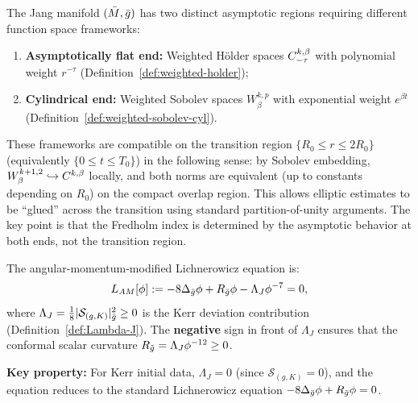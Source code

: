 \begin{remark}\label{rem:space-compatibility}
The Jang manifold $(\bar{M}, \bar{g})$ has two distinct asymptotic regions requiring different function space frameworks:
\begin{enumerate}[label=(\roman*)]
    \item \textbf{Asymptotically flat end:} Weighted H\"older spaces $C^{k,\beta}_{-\tau}$ with polynomial weight $r^{-\tau}$ (Definition~\ref{def:weighted-holder});
    \item \textbf{Cylindrical end:} Weighted Sobolev spaces $W^{k,p}_\beta$ with exponential weight $e^{\beta t}$ (Definition~\ref{def:weighted-sobolev-cyl}).
\end{enumerate}
These frameworks are compatible on the transition region $\{R_0 \leq r \leq 2R_0\}$ (equivalently $\{0 \leq t \leq T_0\}$) in the following sense: by Sobolev embedding, $W^{k+1,2}_\beta \hookrightarrow C^{k,\beta}$ locally, and both norms are equivalent (up to constants depending on $R_0$) on the compact overlap region. This allows elliptic estimates to be ``glued'' across the transition using standard partition-of-unity arguments. The key point is that the Fredholm index is determined by the asymptotic behavior at both ends, not the transition region.
\end{remark}

\begin{definition}\label{def:am-lich}
The angular-momentum-modified Lichnerowicz equation is:
\begin{equation}\label{eq:am-lich}
L_{AM}[\phi] := -8\Delta_{\bar{g}}\phi + R_{\bar{g}}\phi - \Lambda_J \phi^{-7} = 0,
\end{equation}
where $\Lambda_J = \frac{1}{8}|\mathcal{S}_{(g,K)}|^2_{\bar{g}} \geq 0$ is the Kerr deviation contribution (Definition~\ref{def:Lambda-J}). The \textbf{negative} sign in front of $\Lambda_J$ ensures that the conformal scalar curvature $R_{\tilde{g}} = \Lambda_J \phi^{-12} \geq 0$.

\textbf{Key property:} For Kerr initial data, $\Lambda_J = 0$ (since $\mathcal{S}_{(g,K)} = 0$), and the equation reduces to the standard Lichnerowicz equation $-8\Delta_{\bar{g}}\phi + R_{\bar{g}}\phi = 0$.
\end{definition}

